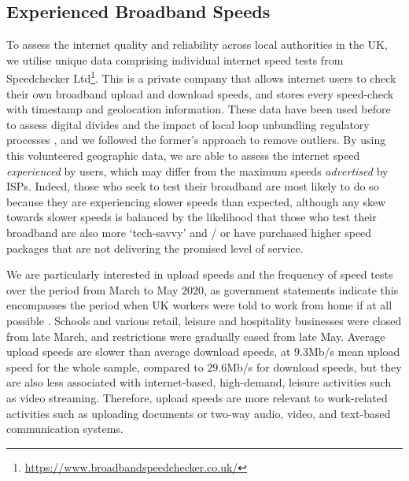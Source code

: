 \documentclass[]{interact}
\theoremstyle{plain}%
\theoremstyle{definition}
\theoremstyle{remark}
\begin{document}
\hypertarget{sec:3.2}{%
\subsection{Experienced Broadband Speeds}\label{sec:3.2}}

To assess the internet quality and reliability across local authorities
in the UK, we utilise unique data comprising individual internet speed
tests from Speedchecker Ltd\footnote{\url{https://www.broadbandspeedchecker.co.uk/}}.
This is a private company that allows internet users to check their own
broadband upload and download speeds, and stores every speed-check with
timestamp and geolocation information. These data have been used before
to assess digital divides \citep{riddlesden2014broadband} and the impact
of local loop unbundling regulatory processes
\citep{nardotto2015unbundling}, and we followed the former's approach to
remove outliers. By using this volunteered geographic data, we are able
to assess the internet speed \emph{experienced} by users, which may
differ from the maximum speeds \emph{advertised} by ISPs. Indeed, those
who seek to test their broadband are most likely to do so because they
are experiencing slower speeds than expected, although any skew towards
slower speeds is balanced by the likelihood that those who test their
broadband are also more `tech-savvy' and / or have purchased higher
speed packages that are not delivering the promised level of service.

We are particularly interested in upload speeds and the frequency of
speed tests over the period from March to May \(2020\), as government
statements indicate this encompasses the period when UK workers were
told to work from home if at all possible \citep{GovUK2020}. Schools and
various retail, leisure and hospitality businesses were closed from late
March, and restrictions were gradually eased from late May. Average
upload speeds are slower than average download speeds, at \(9.3\)Mb/s
mean upload speed for the whole sample, compared to \(29.6\)Mb/s for
download speeds, but they are also less associated with internet-based,
high-demand, leisure activities such as video streaming. Therefore,
upload speeds are more relevant to work-related activities such as
uploading documents or two-way audio, video, and text-based
communication systems.
\end{document}
